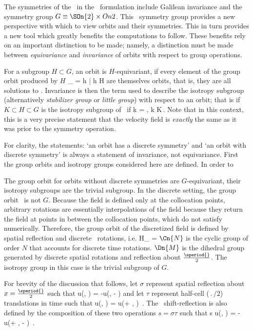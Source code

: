 The symmetries of the \KSe\ in the \spt\ formulation include Galilean invariance and the
symmetry group $G \equiv \SOn{2}\times On{2}$. This \spt\ symmetry group provides a new perspective with which
to view orbits and their symmetries. This in turn provides a new tool which greatly benefits the computations to follow.
These benefits rely on an important distinction to be made; namely, a distinction must be made between \textit{equivariance}
and \textit{invariance} of orbits with respect to group operations.

For a subgroup $H \subset G$, an orbit is $H$-equivariant, if every element of the group orbit produced by $H$
\beq
\Manif_{\orbit} = {h \cdot \orbit | h \in H}
\eeq
are themselves orbits, that is, they are all solutions to . Invariance is then the term
used to describe the isotropy subgroup (alternatively \textit{stabilizer group} or \textit{little group})
with respect to an orbit; that is if $K \subset H \subset G$ is the isotropy subgroup of \orbit\ if
\beq
k \cdot \orbit = \orbit, \quad \forall k \in K\,.
Note that in this context, this is a very precise statement that the velocity field \dufield is \textit{exactly}
the same as it was prior to the symmetry operation.

For clarity, the statements: `an orbit has a discrete symmetry' and
`an orbit with discrete symmetry' is always a statement of invariance, not equivariance. First the group
orbits and isotropy groups considered here are defined. In order to


The group orbit for orbits without discrete symmetries are $G$-equivariant, their isotropy subgroups
are the trivial subgroup. In the discrete setting, the group orbit \dufield\ is not $G$. Because the field
is defined only at the collocation points, arbitrary rotations are essentially interpolations of the field
because they return the field at points in between the collocation points, which do not satisfy 
numerically. Therefore, the group orbit of the discretized field \dufield is defined by
spatial reflection and discrete \spt\ rotations, i.e.
\beq
H_{\orbit} =  \times {}
$\Cn{N}$ is the cyclic group of order $N$ that accounts for discrete time rotations. $\Dn{M}$ is the dihedral group
generated by discrete spatial rotations and reflection about $\frac{\speriod{}}{2}$. The isotropy group in this case
is the trivial subgroup of $G$.

For brevity of the discussion that follows, let $\sigma$ represent spatial reflection about $x = \frac{\speriod{}}{2}$
such that
\beq
\sigma \circ u(\tn, \xm) = -u(\tn, \speriod{} - \xm)
and let $\tau$ represent half-cell ($\period{}/2$) translations in time such that
\beq
\tau \circ u(\tn, \xm) = u(\tn + , \xm) \,.
The \spt\ shift-reflection is also defined by the composition of these two operations $s = \sigma \tau$ such that
\beq
s \circ u(\tn, \xm) = -u(\tn + , \speriod{} - \xm) \,.

